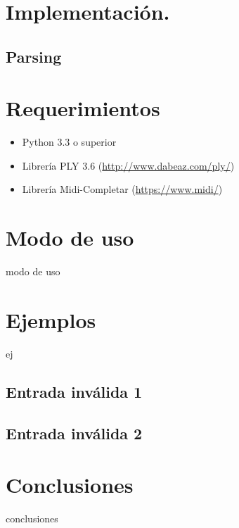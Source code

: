 \documentclass[a4paper,8pt]{article}
\begin{document}
\section{Implementación.}
\subsection{Parsing}

\section{Requerimientos}
	\begin{itemize}
  		\item Python 3.3 o superior
  		\item Librería PLY 3.6 (\url{http://www.dabeaz.com/ply/})
  		\item Librería Midi-Completar (\url{https://www.midi/})
	\end{itemize}

\section{Modo de uso}
modo de uso


\section{Ejemplos}
ej
\subsection{Entrada inválida 1}
\subsection{Entrada inválida 2}



\section{Conclusiones}
conclusiones

\newpage
\end{document}

